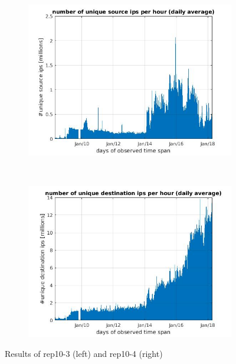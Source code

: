 \begin{figure}[H]
\center
	\begin{subfigure}[b]{0.49\textwidth}
	\includegraphics[width=\textwidth]{./chapters/plots/rep10_3.jpg}\\
	\end{subfigure}
	~
	\begin{subfigure}[b]{0.49\textwidth}
	\includegraphics[width=\textwidth]{./chapters/plots/rep10_4.jpg}\\
	\end{subfigure}

	\caption{Results of rep10-3 (left) and rep10-4 (right)}
\end{figure}

